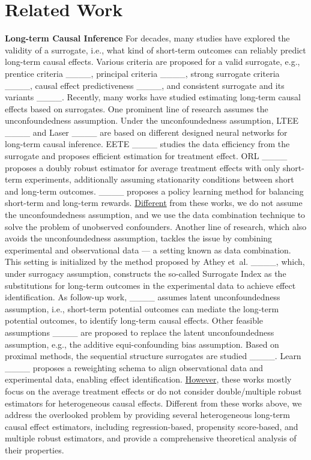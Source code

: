 \section{Related Work}
\textbf{Long-term Causal Inference}
For decades, many studies have explored the validity of a surrogate, i.e., what kind of short-term outcomes can reliably predict long-term causal effects. 
Various criteria are proposed for a valid surrogate, e.g., prentice criteria ____, principal criteria ____, strong surrogate criteria ____, causal effect predictiveness ____, and consistent surrogate and its variants ____.
Recently, many works have studied estimating long-term causal effects based on surrogates. 
One prominent line of research assumes the unconfoundedness assumption.
Under the unconfoundedness assumption, LTEE ____ and Laser ____ are based on different designed neural networks for long-term causal inference.
EETE ____ studies the data efficiency from the surrogate and proposes efficient estimation for treatment effect.
ORL ____ proposes a doubly robust estimator for average treatment effects with only short-term experiments, additionally assuming stationarity conditions between short and long-term outcomes.
____ proposes a policy learning method for balancing short-term and long-term rewards.
\underline{Different} from these works, we do not assume the unconfoundedness assumption, and we use the data combination technique to solve the problem of unobserved confounders.
Another line of research, which also avoids the unconfoundedness assumption, tackles the issue by combining experimental and observational data — a setting known as data combination.
This setting is initialized by the method proposed by Athey et~al. ____, 
which, under surrogacy assumption, constructs the so-called Surrogate Index as the substitutions for long-term outcomes in the experimental data to achieve effect identification.
As follow-up work, ____ assumes latent unconfoundedness assumption, i.e., short-term potential outcomes can mediate the long-term potential outcomes, to identify long-term causal effects.
Other feasible assumptions ____  are proposed to replace the latent unconfoundedness assumption, e.g., the additive equi-confounding bias assumption.
Based on proximal methods, the sequential structure surrogates are studied ____.
Learn ____ proposes a reweighting schema to align observational data and experimental data, enabling effect identification.
\underline{However}, these works mostly focus on the average treatment effects or do not consider double/multiple robust estimators for heterogeneous causal effects.
Different from these works above, we address the overlooked problem by providing several heterogeneous long-term causal effect estimators, including regression-based, propensity score-based, and multiple robust estimators, and provide a comprehensive theoretical analysis of their properties.

